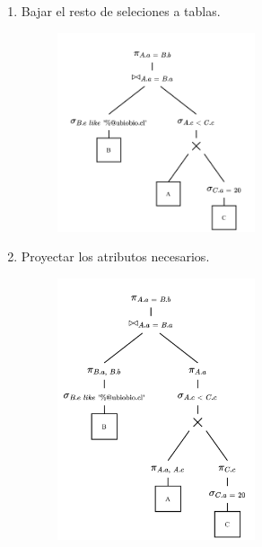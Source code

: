 \documentclass{templateNote}
\begin{document}
\begin{enumerate}
\begin{itemize}
\begin{enumerate}
            \newpage
            \item Bajar el resto de seleciones a tablas.
            \begin{figure}[H]
                \centering
                \includegraphics[width=0.55\textwidth]{img/E3-Paso-5.png}
            \end{figure}

            \item Proyectar los atributos necesarios.
            \begin{figure}[H]
                \centering
                \includegraphics[width=0.55\textwidth]{img/E3-Paso-6.png}
            \end{figure}
        \end{enumerate}
    \end{itemize}


\end{enumerate}
\end{document}

